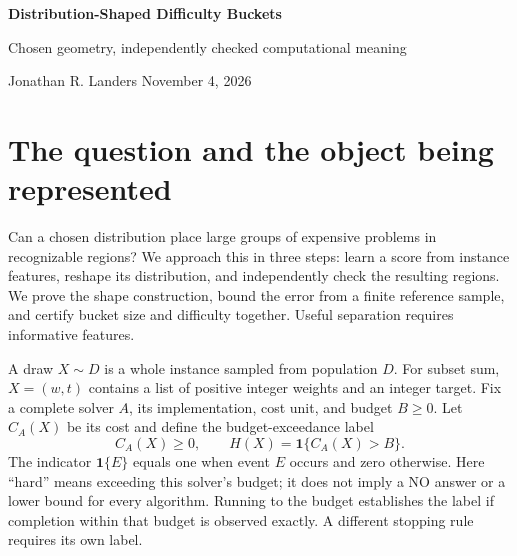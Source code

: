 \documentclass[10pt,letterpaper]{article}
\newcommand{\ind}{\mathbf1}
\begin{document}
{\LARGE\sffamily\bfseries Distribution-Shaped Difficulty Buckets}\par
\vspace{3pt}
{\large\sffamily Chosen geometry, independently checked computational meaning}\par
\vspace{5pt}
{\small Jonathan R. Landers \hfill November 4, 2026}\par

\section{The question and the object being represented}
Can a chosen distribution place large groups of expensive problems in recognizable regions? We approach this in three steps: learn a score from instance features, reshape its distribution, and independently check the resulting regions. We prove the shape construction, bound the error from a finite reference sample, and certify bucket size and difficulty together. Useful separation requires informative features.

A draw $X\sim D$ is a whole instance sampled from population $D$. For subset sum, $X=(w,t)$ contains a list of positive integer weights and an integer target. Fix a complete solver $A$, its implementation, cost unit, and budget $B\ge0$. Let $C_A(X)$ be its cost and define the budget-exceedance label
\begin{equation}\label{eq:label}
 C_A(X)\ge0,\qquad H(X)=\ind\{C_A(X)>B\}.
\end{equation}
The indicator $\ind\{E\}$ equals one when event $E$ occurs and zero otherwise. Here ``hard'' means exceeding this solver's budget; it does not imply a NO answer or a lower bound for every algorithm. Running to the budget establishes the label if completion within that budget is observed exactly. A different stopping rule requires its own label.
\end{document}
